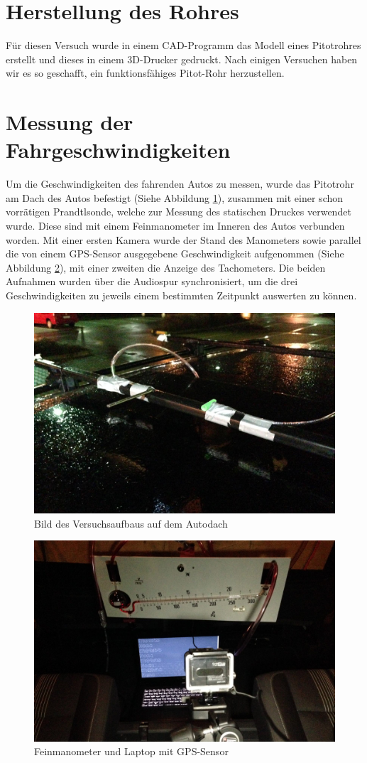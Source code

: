 \section{Herstellung des Rohres}
Für diesen Versuch wurde in einem CAD-Programm das Modell eines Pitotrohres erstellt und dieses in einem 3D-Drucker gedruckt. Nach einigen Versuchen haben wir es so geschafft, ein funktionsfähiges Pitot-Rohr herzustellen.

\section{Messung der Fahrgeschwindigkeiten}
Um die Geschwindigkeiten des fahrenden Autos zu messen, wurde das Pitotrohr am Dach des Autos befestigt (Siehe Abbildung \ref{rohre}), zusammen mit einer schon vorrätigen Prandtlsonde, welche zur Messung des statischen Druckes verwendet wurde. Diese sind mit einem Feinmanometer im Inneren des Autos verbunden worden. Mit einer ersten Kamera wurde der Stand des Manometers sowie parallel die von einem GPS-Sensor ausgegebene Geschwindigkeit aufgenommen (Siehe Abbildung \ref{messung}), mit einer zweiten die Anzeige des Tachometers. Die beiden Aufnahmen wurden über die Audiospur synchronisiert, um die drei Geschwindigkeiten zu jeweils einem bestimmten Zeitpunkt auswerten zu können.

\begin{figure}
\centering
	\includegraphics[width=.8\textwidth]{images/rohre.jpg}
	\caption{Bild des Versuchsaufbaus auf dem Autodach}
	\label{rohre}
\end{figure}

\begin{figure}
\centering
	\includegraphics[width=.8\textwidth]{images/messung.jpg}
	\caption{Feinmanometer und Laptop mit GPS-Sensor}
	\label{messung}
\end{figure}

